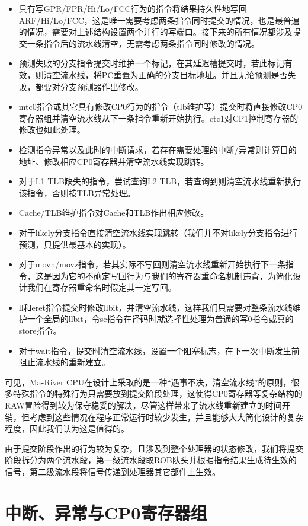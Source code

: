 \begin{itemize}
    \item 具有写GPR/FPR/Hi/Lo/FCC行为的指令将结果持久性地写回ARF/Hi/Lo/FCC，这是唯一需要考虑两条指令同时提交的情况，也是最普遍的情况，需要对上述结构设置两个并行的写端口。接下来的所有情况都涉及提交一条指令后的流水线清空，无需考虑两条指令同时修改的情况。
    \item 预测失败的分支指令提交时维护一个标记，在其延迟槽提交时，若此标记有效，则清空流水线，将PC重置为正确的分支目标地址。并且无论预测是否失败，都要对分支预测器作出修改。
    \item mtc0指令或其它具有修改CP0行为的指令（tlb维护等）提交时将直接修改CP0寄存器组并清空流水线从下一条指令重新开始执行。ctc1对CP1控制寄存器的修改也如此处理。
    \item 检测指令异常以及此时的中断请求，若存在需要处理的中断/异常则计算目的地址、修改相应CP0寄存器并清空流水线实现跳转。
    \item 对于L1 TLB缺失的指令，尝试查询L2 TLB，若查询到则清空流水线重新执行该指令，否则按TLB异常处理。
    \item Cache/TLB维护指令对Cache和TLB作出相应修改。
    \item 对于likely分支指令直接清空流水线实现跳转（我们并不对likely分支指令进行预测，只提供最基本的实现）。
    \item 对于movn/movz指令，若其实际不写回则清空流水线重新开始执行下一条指令，这是因为它的不确定写回行为与我们的寄存器重命名机制违背，为简化设计我们在寄存器重命名时假定其一定写回。
    \item ll和eret指令提交时修改llbit，并清空流水线，这样我们只需要对整条流水线维护一个全局的llbit，令sc指令在译码时就选择性处理为普通的写0指令或真的store指令。
    \item 对于wait指令，提交时清空流水线，设置一个阻塞标志，在下一次中断发生前阻止流水线的重新建立。
\end{itemize}

可见，Ma-River CPU在设计上采取的是一种“遇事不决，清空流水线”的原则，很多特殊指令的特殊行为只需要放到提交阶段处理，这使得CP0寄存器等复杂结构的RAW冒险得到较为保守稳妥的解决，尽管这样带来了流水线重新建立的时间开销，但考虑到这些情况在程序正常运行时较少发生，并且能够大大简化设计的复杂程度，因此我们认为这是值得的。

由于提交阶段作出的行为较为复杂，且涉及到整个处理器的状态修改，我们将提交阶段拆分为两个流水段，第一级流水段取ROB队头并根据指令结果生成待生效的信号，第二级流水段将信号传递到处理器其它部件上生效。

\section{中断、异常与CP0寄存器组}

